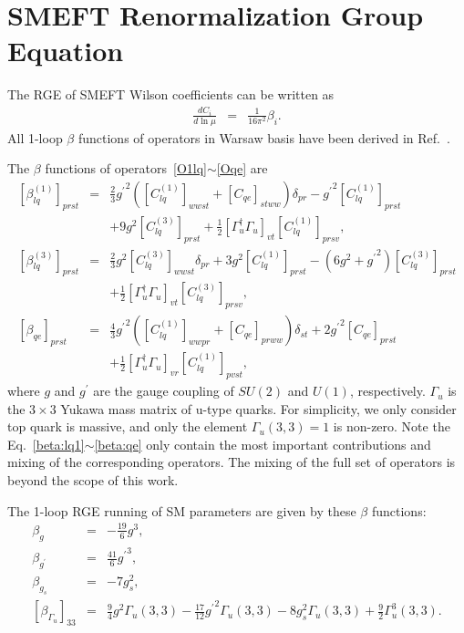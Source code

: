 \documentclass[a4paper,11pt]{article}
\begin{document}
\section{SMEFT Renormalization Group Equation}\label{smeftrge}
The RGE of SMEFT Wilson coefficients can be written as 
\begin{eqnarray}
  \frac{dC_i}{d\ln{\mu}} &=& \frac{1}{16\pi^2}\beta_i. \label{beta:definition}
\end{eqnarray}
All 1-loop $\beta$ functions of operators in Warsaw basis have been derived in Ref.~\cite{Celis:2017hod}. 

The $\beta$ functions of operators~\ref{O1lq}$\sim$\ref{Oqe} are
\begin{eqnarray}
   \left[\beta^{(1)}_{lq}\right]_{prst} &=& \frac{2}{3}{g^\prime}^2\left([C^{(1)}_{lq}]_{wwst}+[C_{qe}]_{stww}\right)\delta_{pr}-{g^\prime}^2[C^{(1)}_{lq}]_{prst}  \nonumber \\
   &&+9g^2[C^{(3)}_{lq}]_{prst}+\frac{1}{2}[\Gamma_u^\dagger\Gamma_u]_{vt}[C^{(1)}_{lq}]_{prsv}, \label{beta:lq1}  \\
   \left[\beta^{(3)}_{lq}\right]_{prst} &=& \frac{2}{3}g^2[C^{(3)}_{lq}]_{wwst}\delta_{pr}+3g^2[C^{(1)}_{lq}]_{prst}-(6g^2+{g^\prime}^2)[C^{(3)}_{lq}]_{prst}  \nonumber \\ 
   && +\frac{1}{2}[\Gamma_u^\dagger\Gamma_u]_{vt}[C^{(3)}_{lq}]_{prsv}, \label{beta:lq3} \\
   \left[\beta_{qe}\right]_{prst} &=& \frac{4}{3}{g^{\prime}}^2\left([C^{(1)}_{lq}]_{wwpr}+[C_{qe}]_{prww}\right)\delta_{st}+2{g^{\prime}}^2[C_{qe}]_{prst} \nonumber  \\
   && +\frac{1}{2}[\Gamma_u^\dagger\Gamma_u]_{vr}[C^{(1)}_{lq}]_{pvst}, \label{beta:qe}
\end{eqnarray}
where $g$ and $g^\prime$ are the gauge coupling of $SU(2)$ and $U(1)$, respectively. 
$\Gamma_{u}$ is the $3\times 3$ Yukawa mass matrix of u-type quarks. 
For simplicity, we only consider top quark is massive, 
and only the element $\Gamma_u(3,3)=1$ is non-zero.
Note the Eq.~\ref{beta:lq1}$\sim$\ref{beta:qe} only contain the most important contributions and mixing of the corresponding operators. 
The mixing of the full set of operators is beyond the scope of this work. 

The 1-loop RGE running of SM parameters are given by these $\beta$ functions:
\begin{eqnarray}
  \beta_{g} &=& -\frac{19}{6}g^3,  \\
  \beta_{g^\prime} &=& \frac{41}{6}{g^\prime}^3,  \\
  \beta_{g_s} &=& -7g^2_s, \\
  \left[\beta_{\Gamma_u}\right]_{33} &=& \frac{9}{4}g^2\Gamma_u(3,3)-\frac{17}{12} {g^\prime}^2\Gamma_u(3,3)-8g^2_s\Gamma_u(3,3)+\frac{9}{2}\Gamma^3_u(3,3).
\end{eqnarray}
\end{document}
